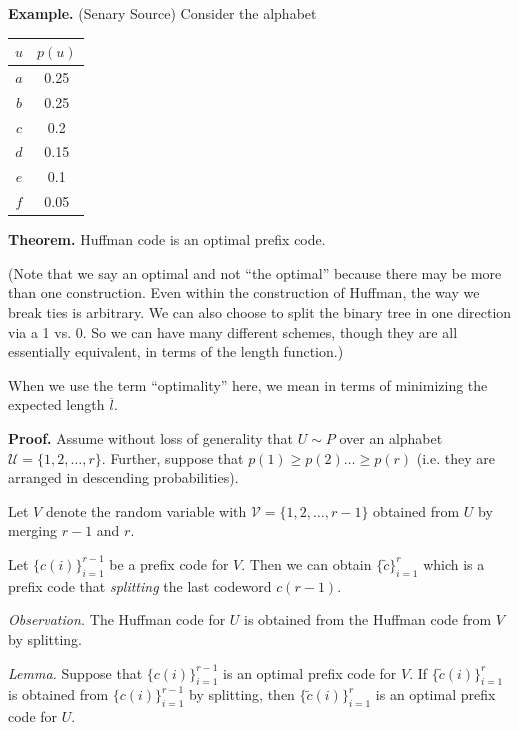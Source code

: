 \documentclass[13pt]{article}
\newcommand{\UU}{\mathcal{U}}
\def\UU{\mathcal{U}}
\def\VV{\mathcal{V}}
\begin{document}
{\bf Example.} (Senary Source) Consider the alphabet


\begin{center}
\begin{tabular}{c|c}
  $u$ & $p(u)$ \\ \hline
  $a$ & 0.25 \\
  $b$ & 0.25 \\
  $c$ & 0.2 \\
  $d$ & 0.15 \\
  $e$ & 0.1 \\
  $f$ & 0.05 
\end{tabular}
\end{center}

{\bf Theorem.} Huffman code is an optimal prefix code.

(Note that we say an optimal and not ``the optimal'' because there may be more than one construction.  Even within the construction of Huffman, the way we break ties is arbitrary.  We can also choose to split the binary tree in one direction via a 1 vs. 0.  So we can have many different schemes, though they are all essentially equivalent, in terms of the length function.)

\def\l{\overline{l}}

When we use the term ``optimality'' here, we mean in terms of minimizing the expected length $\l$.

{\bf Proof.} Assume without loss of generality that $U \sim P$ over an alphabet $\UU = \{ 1, 2, \dots, r \}$.  Further, suppose that $p(1) \geq p(2) \dots \geq p(r)$ (i.e. they are arranged in descending probabilities).

\def\VV{\mathcal{V}}

Let $V$ denote the random variable with $\VV = \{1, 2, \dots, r-1 \}$ obtained from $U$ by merging $r-1$ and $r$.

\def\ct{\tilde{c}}

Let $\{ c(i) \}_{i=1}^{r-1}$ be a prefix code for $V$.  Then we can obtain $\{\ct\}_{i=1}^{r}$ which is a prefix code that \textit{splitting} the last codeword $c(r-1)$.  

{\it Observation.} The Huffman code for $U$ is obtained from the Huffman code from $V$ by splitting.

{\it Lemma.} Suppose that $\{ c(i) \}_{i=1}^{r-1}$ is an optimal prefix code for $V$.  If $\{ \ct(i) \}_{i=1}^{r}$ is obtained from $\{ c(i) \}_{i=1}^{r-1}$ by splitting, then $\{ \ct(i) \}_{i=1}^{r}$ is an optimal prefix code for $U$.
\end{document}
